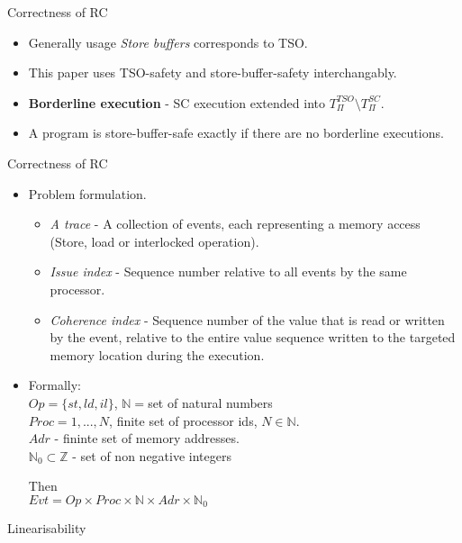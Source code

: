 \documentclass[9pt]{beamer}
\begin{document}
\begin{frame}{Correctness of RC~}
\begin{itemize}
\item Generally usage {\em Store buffers} corresponds to TSO.
\item This paper uses TSO-safety and store-buffer-safety interchangably.
\item \textbf{Borderline execution} - SC execution extended into $T_{\Pi}^{TSO} \setminus  T_{\Pi}^{SC}$.
\item A program is store-buffer-safe exactly if there are no borderline executions.
\end{itemize}

\end{frame}

\begin{frame}{Correctness of RC~}
\begin{itemize}
\item Problem formulation.
	\begin{itemize}
	\item {\em A trace} - A collection of events, each representing a memory access
	      (Store, load or interlocked operation).
	\item {\em Issue index} - Sequence number relative to all events by the same processor.
	\item {\em Coherence index} - Sequence number of the value that is read or written
        by the event, relative to the entire value sequence written to the targeted memory 
			  location during the execution.	
	\end{itemize}
\item Formally: \\
\hspace{2cm}$Op = \{st, ld, il\}$, $\mathbb{N} = $set of natural numbers\\
\hspace{2cm}$Proc = {1,...,N}$, finite set of processor ids, $N \in \mathbb{N}$.\\
\hspace{2cm}$Adr$ - fininte set of memory addresses.\\
\hspace{2cm}$\mathbb{N}_0 \subset \mathbb{Z}$ - set of non negative integers

Then\\
\hspace{2cm}$Evt = Op \times Proc \times \mathbb{N} \times Adr \times \mathbb{N}_0$


              
\end{itemize}
\end{frame}

\begin{frame}{Linearisability}
\end{frame}

\footnotesize{


}
\end{document}
